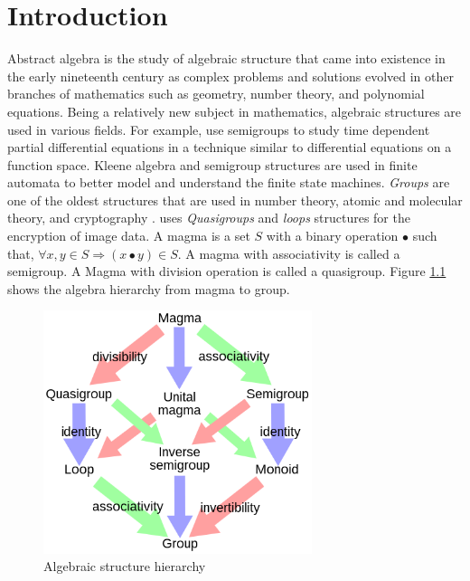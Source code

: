\chapter{Introduction}
Abstract algebra is the study of algebraic structure that came into existence in
the early nineteenth century as complex problems and solutions evolved in other
branches of mathematics such as geometry, number theory, and polynomial
equations. Being a relatively new subject in mathematics, algebraic structures
are used in various fields. For example, \cite{liaqat2021some} use semigroups
 to study time dependent partial
differential equations in a technique similar to differential equations on a
function space. Kleene algebra and semigroup structures are used in finite
automata to better model and understand the finite state machines.
\textit{Groups} are one of the oldest structures that are used in number theory,
atomic and molecular theory, and cryptography \cite{enwiki:1133598242}.
\cite{bruck1944some} uses \textit{Quasigroups} and \textit{loops} structures for
the encryption of image data. A magma is a set $S$ with a binary operation $∙$
such that, $\forall x,y \in S \Rightarrow (x ∙ y) \in S$. A magma with
associativity is called a semigroup. A Magma with division operation is called a
quasigroup. Figure \ref{fig_magma} shows the algebra hierarchy from magma to
group. 
 \begin{figure}[ht]
	\centering
	\includegraphics[width=0.7\textwidth]{figures/Sample/Magma_to_group.jpg}
	\caption{Algebraic structure hierarchy \cite{enwiki:1107380309}}
	\label{fig_magma}
 \end{figure}

